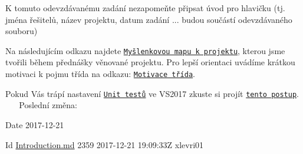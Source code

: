 K tomuto odevzdávanému zadání nezapomeňte připsat úvod pro hlavičku (tj. jména řešitelů, název projektu, datum zadání ... budou součástí odevzdávaného souboru)

Na následujícím odkazu najdete \href{https://my.mindnode.com/s2Bbn2gFS8pHZFGcZJhRj4U7zmxx8ivygkoPCuZz}{\tt Myšlenkovou mapu k projektu}, kterou jsme tvořili během přednášky věnované projektu. Pro lepší orientaci uvádíme krátkou motivaci k pojmu třída na odkazu\+: \href{http://www.uamt.feec.vutbr.cz/~richter/vyuka/XPPC/bppc/cviceni/motivace_trida.html}{\tt Motivace třída}.

Pokud Vás trápí nastavení \href{https://en.wikipedia.org/wiki/Test-driven_development}{\tt Unit testů} ve V\+S2017 zkuste si projít \href{http://www.evernote.com/l/AElAKsn_ps1ONbQRPVcvgmGPXcK76B0P0qs/}{\tt tento postup}. ~\newline
~\newline
Poslední změna\+: \begin{DoxyParagraph}{Date}
2017-\/12-\/21
\end{DoxyParagraph}


\begin{DoxyParagraph}{Id}
\hyperlink{_introduction_8md}{Introduction.\+md} 2359 2017-\/12-\/21 19\+:09\+:33Z xlevri01 
\end{DoxyParagraph}
